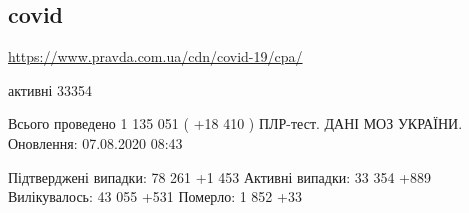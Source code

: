  
 
\subsection{covid}
\label{sec:07_08_2020.covid}
\url{https://www.pravda.com.ua/cdn/covid-19/cpa/}

  
активні 33354

Всього проведено 1 135 051 ( +18 410 ) ПЛР-тест.
ДАНІ МОЗ УКРАЇНИ. Оновлення: 07.08.2020 08:43

Підтверджені випадки: 78 261 +1 453 Активні випадки: 33 354 +889 Вилікувалось:
43 055 +531 Померло: 1 852 +33
  

